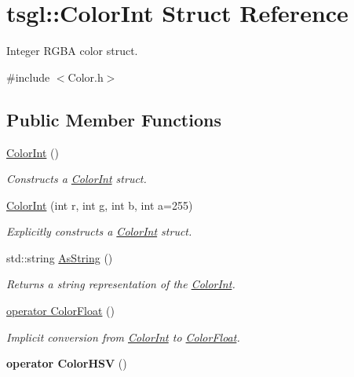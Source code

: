 \hypertarget{structtsgl_1_1_color_int}{}\section{tsgl\+:\+:Color\+Int Struct Reference}
\label{structtsgl_1_1_color_int}


Integer R\+G\+B\+A color struct.  




{\ttfamily \#include $<$Color.\+h$>$}

\subsection*{Public Member Functions}
\begin{DoxyCompactItemize}
\item 
\hyperlink{structtsgl_1_1_color_int_a7826d99c97b598cadc325716a8b06dbe}{Color\+Int} ()
\begin{DoxyCompactList}\small\item\em Constructs a \hyperlink{structtsgl_1_1_color_int}{Color\+Int} struct. \end{DoxyCompactList}\item 
\hyperlink{structtsgl_1_1_color_int_a0f0dea0c416a290eb4fdaf7583e27285}{Color\+Int} (int r, int g, int b, int a=255)
\begin{DoxyCompactList}\small\item\em Explicitly constructs a \hyperlink{structtsgl_1_1_color_int}{Color\+Int} struct. \end{DoxyCompactList}\item 
std\+::string \hyperlink{structtsgl_1_1_color_int_ad03b5c33b1096924e2cbeac28fe690e4}{As\+String} ()
\begin{DoxyCompactList}\small\item\em Returns a string representation of the \hyperlink{structtsgl_1_1_color_int}{Color\+Int}. \end{DoxyCompactList}\item 
\hyperlink{structtsgl_1_1_color_int_a34855245876c1ccee51625086f671ebf}{operator Color\+Float} ()
\begin{DoxyCompactList}\small\item\em Implicit conversion from \hyperlink{structtsgl_1_1_color_int}{Color\+Int} to \hyperlink{structtsgl_1_1_color_float}{Color\+Float}. \end{DoxyCompactList}\item 
\hypertarget{structtsgl_1_1_color_int_acbd82ad2c6388389aa3474f042a25353}{}{\bfseries operator Color\+H\+S\+V} ()\label{structtsgl_1_1_color_int_acbd82ad2c6388389aa3474f042a25353}


\end{DoxyCompactItemize}
